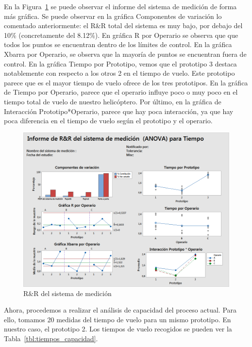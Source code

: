 \documentclass[12pt,a4paper,twoside,openright,titlepage,final]{article}
\begin{document}
En la Figura~\ref{fig:R&RdelsistemademediciónparaTiempo} se puede observar el informe del sistema de medición de forma más gráfica. Se puede observar en la gráfica Componentes de variación lo comentado anteriormente: el R\&R total del sistema es muy bajo, por debajo del 10\% (concretamente del 8.12\%). En gráfica R por Operario se observa que que todos los puntos se encuentran dentro de los límites de control. En la gráfica Xbarra por Operario, se observa que la mayoría de puntos se encuentran fuera de control. En la gráfica Tiempo por Prototipo, vemos que el prototipo 3 destaca notablemente con respecto a los otros 2 en el tiempo de vuelo. Este prototipo parece que es el mayor tiempo de vuelo ofrece de los tres prototipos. En la gráfica de Tiempo por Operario, parece que el operario influye poco o muy poco en el tiempo total de vuelo de nuestro helicóptero. Por último, en la gráfica de Interacción Prototipo*Operario, parece que hay poca interacción, ya que hay poca diferencia en el tiempo de vuelo según el prototipo y el  operario.\\

\begin{figure}[htbp!]
	\centering
	\includegraphics[width=0.7\linewidth]{imagenes/RR_del_sistema_de_medicion_para_Tiempo}
	\caption{R\&R del sistema de medición}
	\label{fig:R&RdelsistemademediciónparaTiempo}
\end{figure}

Ahora, procedemos a realizar el análisis de capacidad del proceso actual. Para ello, tomamos 20 medidas del tiempo de vuelo para un mismo prototipo. En nuestro caso, el prototipo 2. Los tiempos de vuelo recogidos se pueden ver la Tabla~\ref{tbl:tiempos_capacidad}.\\
\end{document}

